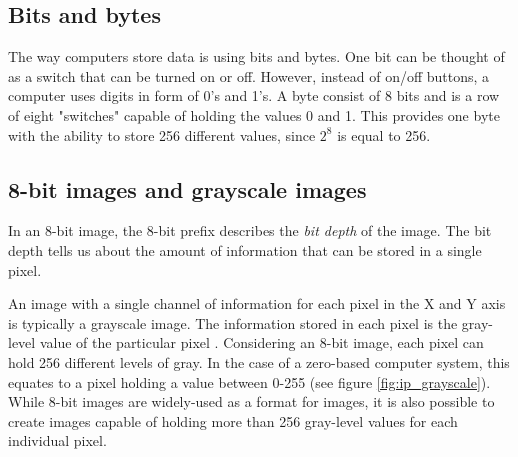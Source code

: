 \subsection{Bits and bytes}
The way computers store data is using bits and bytes. One bit can be thought of as a switch that can be turned on or off. However, instead of on/off buttons, a computer uses digits in form of 0's and 1's. A byte consist of 8 bits and is a row of eight "switches" capable of holding the values 0 and 1. This provides one byte with the ability to store 256 different values, since $2^{8}$ is equal to 256. 




\subsection{8-bit images and grayscale images}
In an 8-bit image, the 8-bit prefix describes the \textit{bit depth} of the image. The bit depth tells us about the amount of information that can be stored in a single pixel.


An image with a single channel of information for each pixel in the X and Y axis is typically a grayscale image. The information stored in each pixel is the gray-level value of the particular pixel \citep{ip_book}. Considering an 8-bit image, each pixel can hold 256 different levels of gray. In the case of a zero-based computer system, this equates to a pixel holding a value between 0-255 (see figure \ref{fig:ip_grayscale}). While 8-bit images are widely-used as a format for images, it is also possible to create images capable of holding more than 256 gray-level values for each individual pixel.

